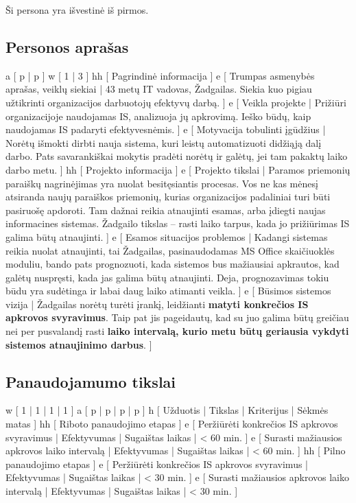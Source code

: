 ﻿Ši persona yra išvestinė iš pirmos.
\subsection{Personos aprašas}
\xtableu
{
  a [ p | p ]
  w [ 1 | 3 ]
  hh [ Pagrindinė informacija ]
  e [ Trumpas asmenybės aprašas, veiklų siekiai 
  | 
    43 metų IT vadovas, Žadgailas. Siekia kuo pigiau užtikrinti
    organizacijos darbuotojų efektyvų darbą.
  ]
  e [ Veikla projekte 
  | 
    Prižiūri organizacijoje naudojamas IS, analizuoja jų apkrovimą.
    Ieško būdų, kaip naudojamas IS padaryti efektyvesnėmis.
  ]
  e [ Motyvacija tobulinti įgūdžius 
  |
    Norėtų išmokti dirbti nauja sistema, kuri leistų automatizuoti
    didžiąją dalį darbo. Pats savarankiškai mokytis pradėti
    norėtų ir galėtų, jei tam pakaktų laiko darbo metu.
  ]
  hh [ Projekto informacija ]
  e [ Projekto tikslai 
  | 
    Paramos priemonių paraiškų nagrinėjimas yra nuolat
    besitęsiantis procesas. Vos ne kas mėnesį atsiranda naujų
    paraiškos priemonių, kurias organizacijos padaliniai turi būti
    pasiruošę apdoroti. Tam dažnai reikia atnaujinti esamas, arba
    įdiegti naujas informacines sistemas. Žadgailo tikslas – rasti
    laiko tarpus, kada jo prižiūrimas IS galima būtų atnaujinti.
  ]
  e [ Esamos situacijos problemos 
  | 
    Kadangi sistemas reikia nuolat atnaujinti, tai Žadgailas,
    pasinaudodamas MS Office skaičiuoklės moduliu, bando pats
    prognozuoti, kada sistemos bus mažiausiai apkrautos, kad galėtų
    nuspręsti, kada jas galima būtų atnaujinti. Deja, prognozavimas
    tokiu būdu yra sudėtinga ir labai daug laiko atimanti veikla.
  ]
  e [ Būsimos sistemos vizija 
  | 
    Žadgailas norėtų turėti įrankį, leidžianti \textbf{matyti konkrečios
    IS apkrovos svyravimus}. Taip pat jis pageidautų, kad su juo
    galima būtų greičiau nei per pusvalandį rasti \textbf{laiko intervalą,
    kurio metu būtų geriausia vykdyti sistemos atnaujinimo darbus}.
  ]
}

\newpage
\subsection{Panaudojamumo tikslai}
\xtable
{
  w [ 1 | 1 | 1 | 1 ]
  a [ p | p | p | p ]
  h [ Užduotis | Tikslas | Kriterijus | Sėkmės matas ]
  hh [ Riboto panaudojimo etapas ]
  e [ Peržiūrėti konkrečios IS apkrovos svyravimus | Efektyvumas | Sugaištas laikas | < 60 min. ]
  e [ Surasti mažiausios apkrovos laiko intervalą | Efektyvumas | Sugaištas laikas | < 60 min. ]
  hh [ Pilno panaudojimo etapas ]
  e [ Peržiūrėti konkrečios IS apkrovos svyravimus | Efektyvumas | Sugaištas laikas | < 30 min. ]
  e [ Surasti mažiausios apkrovos laiko intervalą | Efektyvumas | Sugaištas laikas | < 30 min. ]
}
